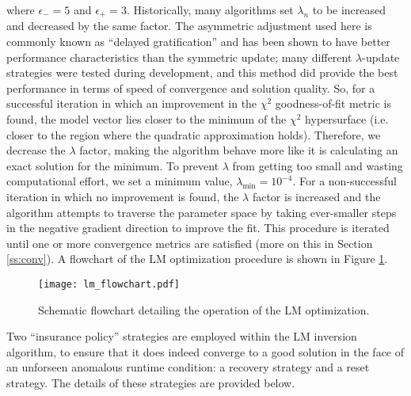 \documentclass[11pt]{article}
\begin{document}
where $\epsilon_{-} = 5$ and $\epsilon_{+} = 3$.  Historically, many algorithms set $\lambda_{n}$ to be increased
and decreased by the same factor.  The asymmetric adjustment used here is commonly known as ``delayed gratification'' and
has been shown to have better performance characteristics than the symmetric update; many different $\lambda$-update
strategies were tested during development, and this method did provide the best performance in terms of speed
of convergence and solution quality.  So, for a successful iteration in which an improvement in the $\chi^{2}$
goodness-of-fit metric is found, the model vector lies closer to the minimum of the $\chi^{2}$ hypersurface (i.e. closer
to the region where the quadratic approximation holds).  Therefore, we decrease the $\lambda$ factor, making the algorithm
behave more like it is calculating an exact solution for the minimum.  To prevent $\lambda$ from getting too small and
wasting computational effort, we set a minimum value, $\lambda_{\mathrm{min}} = 10^{-4}$.  For a non-successful iteration in
which no improvement is found, the $\lambda$ factor is increased and the algorithm attempts to traverse the parameter
space by taking ever-smaller steps in the negative gradient direction to improve the fit.  This procedure is iterated
until one or more convergence metrics are satisfied (more on this in Section \ref{ss:conv}).  A flowchart of the LM optimization
procedure is shown in Figure \ref{fig:lm_flow}.\\

\begin{figure}
\centering
\texttt{[image: lm\_flowchart.pdf]}
\caption{Schematic flowchart detailing the operation of the LM optimization.}
\label{fig:lm_flow}
\end{figure}

Two ``insurance policy'' strategies are employed within the LM inversion algorithm, to ensure that
it does indeed converge to a good solution in the face of an unforseen anomalous runtime condition:
a recovery strategy and a reset strategy.  The details of these strategies are provided below.
\end{document}
